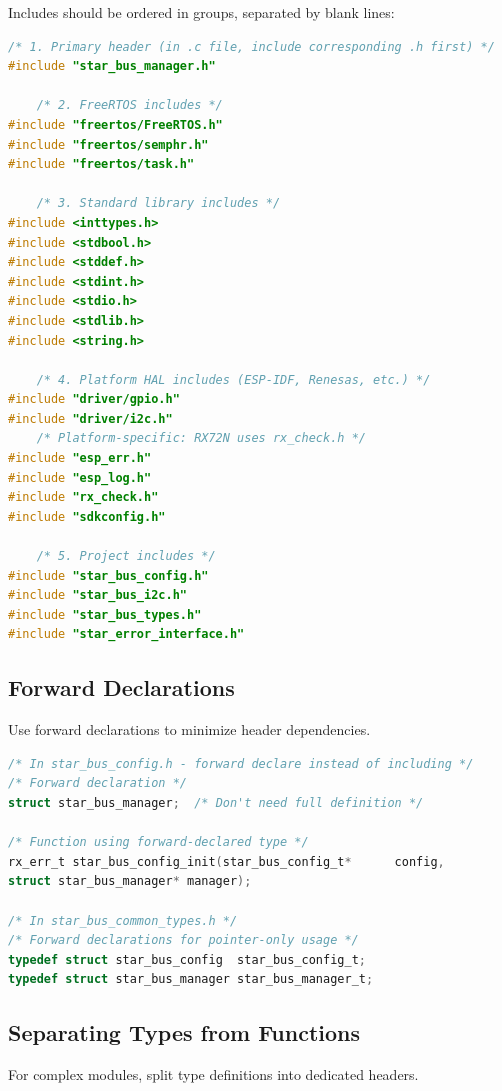 Includes should be ordered in groups, separated by blank lines:

\begin{lstlisting}[language=C]
    /* 1. Primary header (in .c file, include corresponding .h first) */
#include "star_bus_manager.h"

    /* 2. FreeRTOS includes */
#include "freertos/FreeRTOS.h"
#include "freertos/semphr.h"
#include "freertos/task.h"

    /* 3. Standard library includes */
#include <inttypes.h>
#include <stdbool.h>
#include <stddef.h>
#include <stdint.h>
#include <stdio.h>
#include <stdlib.h>
#include <string.h>

    /* 4. Platform HAL includes (ESP-IDF, Renesas, etc.) */
#include "driver/gpio.h"
#include "driver/i2c.h"
    /* Platform-specific: RX72N uses rx_check.h */
#include "esp_err.h"
#include "esp_log.h"
#include "rx_check.h"
#include "sdkconfig.h"

    /* 5. Project includes */
#include "star_bus_config.h"
#include "star_bus_i2c.h"
#include "star_bus_types.h"
#include "star_error_interface.h"
\end{lstlisting}

\subsection{Forward Declarations}

Use forward declarations to minimize header dependencies.

\begin{lstlisting}[language=C]
/* In star_bus_config.h - forward declare instead of including */
/* Forward declaration */
struct star_bus_manager;  /* Don't need full definition */

/* Function using forward-declared type */
rx_err_t star_bus_config_init(star_bus_config_t*      config,
struct star_bus_manager* manager);

/* In star_bus_common_types.h */
/* Forward declarations for pointer-only usage */
typedef struct star_bus_config  star_bus_config_t;
typedef struct star_bus_manager star_bus_manager_t;
\end{lstlisting}

\subsection{Separating Types from Functions}

For complex modules, split type definitions into dedicated headers.

